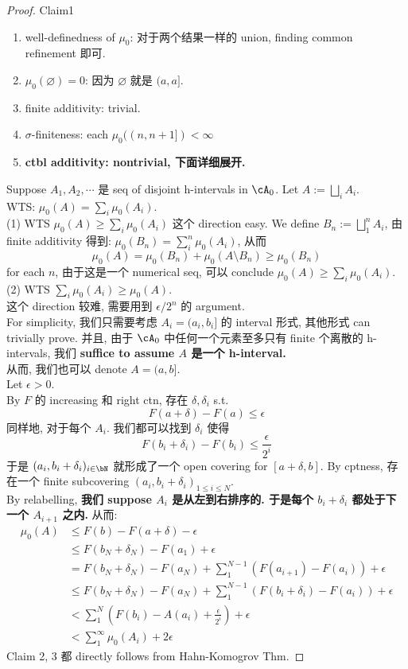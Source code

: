 \documentclass[lang=cn,11pt]{elegantbook}
\begin{document}
\begin{proof}
Claim1 
\begin{enumerate}
    \item well-definedness of $\mu_0$: 对于两个结果一样的 union, finding common refinement 即可.
    \item $\mu_0(\varnothing) = 0$: 因为 $\varnothing$ 就是 $(a,a]$.
    \item finite additivity: trivial.
    \item $\sigma$-finiteness: each $\mu_0((n, n+1]) < \infty$
    \item \textbf{ctbl additivity: nontrivial, 下面详细展开.}
\end{enumerate}
Suppose $A_1, A_2, \cdots$ 是 seq of disjoint h-intervals in $\cA_0$. Let $A := \bigsqcup_{i}A_i $.\\
WTS: $\mu_0(A) = \sum_i \mu_0(A_i)$.\\
(1) WTS $\mu_0(A) \geq \sum_i \mu_0(A_i)$
这个 direction easy. We define $B_n  := \bigsqcup_1^n A_i$, 由 finite additivity 得到: $\mu_0(B_n) = \sum_{i}^n \mu_0(A_i)$, 从而 
$$
\mu_0(A) = \mu_0(B_n) + \mu_0(A \setminus B_n) \geq \mu_0(B_n)
$$ for each $n$, 由于这是一个 numerical seq, 可以 conclude $\mu_0(A) \geq \sum_i \mu_0(A_i)$.
(2) WTS $\sum_i \mu_0(A_i) \geq \mu_0(A)$.\\
这个 direction 较难, 需要用到 $\epsilon / 2^n$ 的 argument.\\
For simplicity, 我们只需要考虑 $A_i = (a_i, b_i]$ 的 interval 形式, 其他形式 can trivially prove. 并且, 由于 $\cA_0$ 中任何一个元素至多只有 finite 个离散的 h-intervals, 我们 \textbf{suffice to assume $A$ 是一个 h-interval.} \\
从而, 我们也可以 denote $A = (a,b]$.\\
Let $\epsilon > 0$.\\
By $F$ 的 increasing 和 right ctn, 存在 $\delta, \delta_i$ s.t.
$$
F(a+ \delta)- F(a) \leq \epsilon
$$
同样地, 对于每个 $A_i$. 我们都可以找到 $\delta_i$ 使得 
$$
    F(b_i + \delta_i) - F(b_i) \leq \frac{\epsilon}{2^i}
$$
于是 $(a_i, b_i+\delta_i)_{i \in \bN}$ 就形成了一个 open covering for $[a+ \delta, b]$. By cptness, 存在一个 finite subcovering $(a_i, b_i+\delta_i)_{1 \leq i \leq N}$.\\
By relabelling, \textbf{我们 suppose $A_i$ 是从左到右排序的. 于是每个 $b_i + \delta_i$ 都处于下一个 $A_{i+1}$ 之内.}
从而:
\begin{align}
    \mu_0(A) & \leq F(b) - F(a+ \delta) - \epsilon \\
    &\leq F(b_N + \delta_N) - F(a_1) + \epsilon \\
    & =  F(b_N + \delta_N) - F(a_N) +\sum_1^{N-1} (F(a_{i+1}  ) - F(a_i)) + \epsilon \\
    & \leq  F(b_N + \delta_N) - F(a_N) +\sum_1^{N-1} (F(b_i + \delta_i  ) - F(a_i)) + \epsilon \\ & < \sum_1^N (F(b_i) - A(a_i) + \frac{\epsilon}{2^i}) + \epsilon
    \\ & < \sum_ 1^\infty \mu_0(A_i) + 2\epsilon
\end{align}
Claim 2, 3 都 directly follows from Hahn-Komogrov Thm.
\end{proof}
\end{document}
